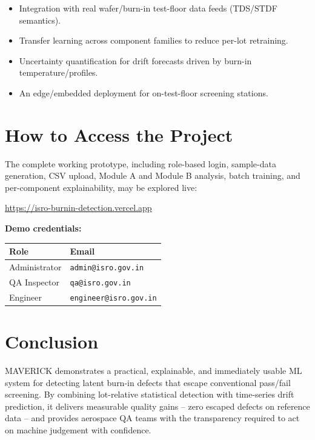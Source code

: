 \documentclass[11pt,a4paper]{article}
\begin{document}
\begin{itemize}[leftmargin=1.5em]
  \item Integration with real wafer/burn-in test-floor data feeds (TDS/STDF semantics).
  \item Transfer learning across component families to reduce per-lot retraining.
  \item Uncertainty quantification for drift forecasts driven by burn-in temperature/profiles.
  \item An edge/embedded deployment for on-test-floor screening stations.
\end{itemize}

\section{How to Access the Project}
\label{sec:access}

The complete working prototype, including role-based login, sample-data generation, CSV upload,
Module A and Module B analysis, batch training, and per-component explainability, may be explored
live:

\begin{center}
\Large\url{https://isro-burnin-detection.vercel.app}
\end{center}

\vspace{0.4cm}
\textbf{Demo credentials:}
\begin{center}
\begin{tabular}{ll}
  \toprule
  \textbf{Role} & \textbf{Email} \\
  \midrule
  Administrator & \texttt{admin@isro.gov.in}   \\
  QA Inspector  & \texttt{qa@isro.gov.in}      \\
  Engineer      & \texttt{engineer@isro.gov.in} \\
  \bottomrule
\end{tabular}
\end{center}

\section{Conclusion}
\label{sec:conclusion}

MAVERICK demonstrates a practical, explainable, and immediately usable ML system for detecting
latent burn-in defects that escape conventional pass/fail screening. By combining lot-relative
statistical detection with time-series drift prediction, it delivers measurable quality gains --
zero escaped defects on reference data -- and provides aerospace QA teams with the transparency
required to act on machine judgement with confidence.
\end{document}
